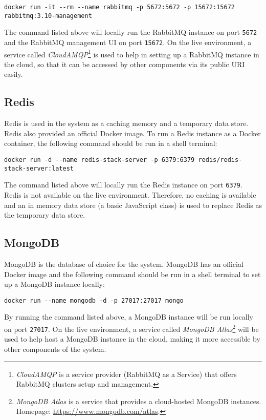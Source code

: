  \begin{lstlisting}[caption={Running a RabbitMQ instance with Docker (Shell)}]
 docker run -it --rm --name rabbitmq -p 5672:5672 -p 15672:15672 rabbitmq:3.10-management 
 \end{lstlisting}

 The command listed above will locally run the RabbitMQ instance on port \verb;5672; and the RabbitMQ management UI on port \verb;15672;. On the live environment, a service called \emph{CloudAMQP}\footnote{\emph{CloudAMQP} is a service provider (RabbitMQ as a Service) that offers RabbitMQ clusters setup and management.} is used to help in setting up a RabbitMQ instance in the cloud, so that it can be accessed by other components via its public URI easily.

 \subsection{Redis}
 Redis is used in the system as a caching memory and a temporary data store. Redis also provided an official Docker image. To run a Redis instance as a Docker container, the following command should be run in a shell terminal:

 \begin{lstlisting}[caption={Running a Redis instance with Docker (Shell)}]
 docker run -d --name redis-stack-server -p 6379:6379 redis/redis-stack-server:latest
 \end{lstlisting}

 The command listed above will locally run the Redis instance on port \verb;6379;. Redis is not available on the live environment. Therefore, no caching is available and an in memory data store (a basic JavaScript class) is used to replace Redis as the temporary data store.

 \subsection{MongoDB}
 MongoDB is the database of choice for the system. MongoDB has an official Docker image and the following command should be run in a shell terminal to set up a MongoDB instance locally:

 \begin{lstlisting}[caption={Running a MongoDB instance with Docker (Shell)}]
 docker run --name mongodb -d -p 27017:27017 mongo 
 \end{lstlisting}

 By running the command listed above, a MongoDB instance will be run locally on port \verb;27017;. On the live environment, a service called \emph{MongoDB Atlas}\footnote{\emph{MongoDB Atlas} is a service that provides a cloud-hosted MongoDB instances. Homepage: \url{https://www.mongodb.com/atlas}.} will be used to help host a MongoDB instance in the cloud, making it more accessible by other components of the system.
 
